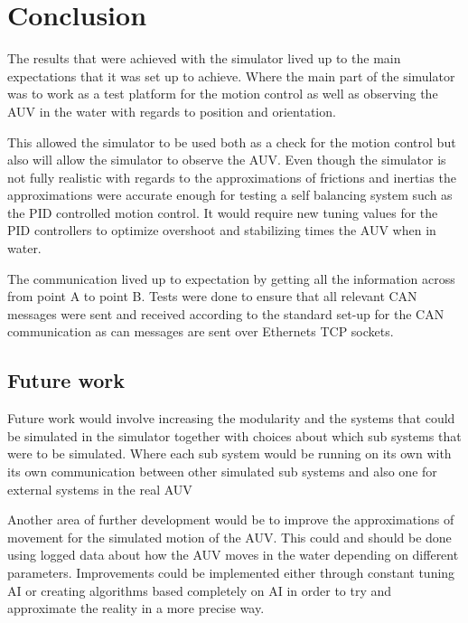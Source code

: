 \section{Conclusion}\label{sec:conclusion}
The results that were achieved with the simulator lived up to the main expectations that it was set up to achieve. Where the main part of the simulator was to work as a test platform for the motion control as well as observing the AUV in the water with regards to position and orientation.

This allowed the simulator to be used both as a check for the motion control but also will allow the simulator to observe the AUV. Even though the simulator is not fully realistic with regards to the approximations of frictions and inertias the approximations were accurate enough for testing a self balancing system such as the PID controlled motion control. It would require new tuning values for the PID controllers to optimize overshoot and stabilizing times the AUV when in water.

The communication lived up to expectation by getting all the information across from point A to point B. Tests were done to ensure that all relevant CAN messages were sent and received according to the standard set-up for the CAN communication as can messages are sent over Ethernets TCP sockets.

\subsection{Future work}
Future work would involve increasing the modularity and the systems that could be simulated in the simulator together with choices about which sub systems that were to be simulated. Where each sub system would be running on its own with its own communication between other simulated sub systems and also one for external systems in the real AUV

Another area of further development would be to improve the approximations of movement for the simulated motion of the AUV. This could and should be done using logged data about how the AUV moves in the water depending on different parameters. Improvements could be implemented either through constant tuning AI or creating algorithms based completely on AI in order to try and approximate the reality in a more precise way. 
